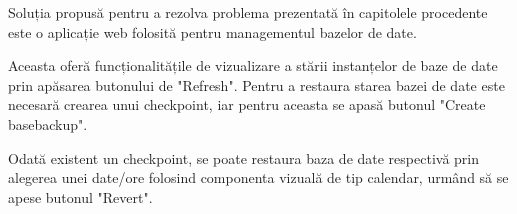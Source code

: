 Soluția propusă pentru a rezolva problema prezentată în capitolele procedente este o aplicație web folosită pentru managementul bazelor de date.
\par 
Aceasta oferă funcționalitățile de vizualizare a stării instanțelor de baze de date prin apăsarea butonului de "Refresh". Pentru a restaura starea bazei de date este necesară crearea unui checkpoint, iar pentru aceasta se apasă butonul "Create basebackup".
\par
Odată existent un checkpoint, se poate restaura baza de date respectivă prin alegerea unei date/ore folosind componenta vizuală de tip calendar, urmând să se apese butonul "Revert".